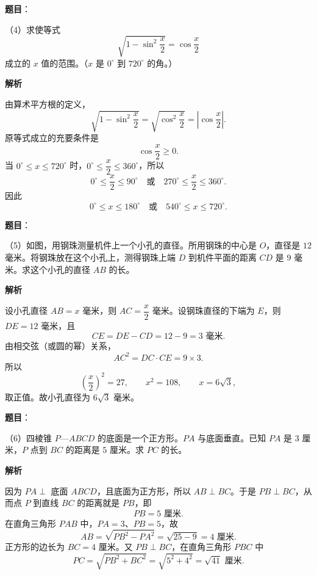 \begin{answer}

\textbf{题目}：

（4）求使等式
\[
\sqrt{1-\sin^2\frac{x}{2}}=\cos\frac{x}{2}
\]
成立的 $x$ 值的范围。（$x$ 是 $0^\circ$ 到 $720^\circ$ 的角。）

\textbf{解析}

由算术平方根的定义，
\[
\sqrt{1-\sin^2\frac{x}{2}}=
\sqrt{\cos^2\frac{x}{2}}=\left|\cos\frac{x}{2}\right|.
\]
原等式成立的充要条件是
\[
\cos\frac{x}{2}\ge0.
\]
当 $0^\circ\le x\le720^\circ$ 时，$0^\circ\le\dfrac{x}{2}\le360^\circ$，所以
\[
0^\circ\le\frac{x}{2}\le90^\circ
\quad\text{或}\quad
270^\circ\le\frac{x}{2}\le360^\circ.
\]
因此
\[
0^\circ\le x\le180^\circ
\quad\text{或}\quad
540^\circ\le x\le720^\circ.
\]


\end{answer}
\begin{answer}

\textbf{题目}：

（5）如图，用钢珠测量机件上一个小孔的直径。所用钢珠的中心是 $O$，直径是 $12$ 毫米。将钢珠放在这个小孔上，测得钢珠上端 $D$ 到机件平面的距离 $CD$ 是 $9$ 毫米。求这个小孔的直径 $AB$ 的长。
\nopagebreak[4]
\begin{center}\end{center}
\nopagebreak[4]
\textbf{解析}

设小孔直径 $AB=x$ 毫米，则 $AC=\dfrac{x}{2}$ 毫米。设钢珠直径的下端为 $E$，则 $DE=12$ 毫米，且
\[
CE=DE-CD=12-9=3\text{ 毫米}.
\]
由相交弦（或圆的幂）关系，
\[
AC^2=DC\cdot CE=9\times3.
\]
所以
\[
\left(\frac{x}{2}\right)^2=27,
\qquad x^2=108,
\qquad x=6\sqrt3,
\]
取正值。故小孔直径为 $6\sqrt3$ 毫米。


\end{answer}
\begin{answer}

\textbf{题目}：

（6）四棱锥 $P$—$ABCD$ 的底面是一个正方形。$PA$ 与底面垂直。已知 $PA$ 是 $3$ 厘米，$P$ 点到 $BC$ 的距离是 $5$ 厘米。求 $PC$ 的长。
\nopagebreak[4]
\begin{center}\end{center}
\nopagebreak[4]
\textbf{解析}

因为 $PA\perp$ 底面 $ABCD$，且底面为正方形，所以 $AB\perp BC$。于是 $PB\perp BC$，从而点 $P$ 到直线 $BC$ 的距离就是 $PB$，即
\[
PB=5\text{ 厘米}.
\]
在直角三角形 $PAB$ 中，$PA=3$、$PB=5$，故
\[
AB=\sqrt{PB^2-PA^2}=\sqrt{25-9}=4\text{ 厘米}.
\]
正方形的边长为 $BC=4$ 厘米。又 $PB\perp BC$，在直角三角形 $PBC$ 中
\[
PC=\sqrt{PB^2+BC^2}=\sqrt{5^2+4^2}=\sqrt{41}\text{ 厘米}.
\]


\end{answer}

